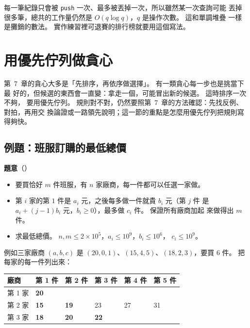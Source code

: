 每一筆紀錄只會被 \texttt{push} 一次、最多被丟掉一次，所以雖然某一次查詢可能
丟掉很多筆，總共的工作量仍然是 $O(q \log q)$，$q$ 是操作次數。 這和單調堆疊
一樣是攤銷的數法。 實作練習裡可退賽的排行榜就要用這個寫法。

\section{用優先佇列做貪心}
\label{sec:pq-greedy}

第~7~章的貪心大多是「先排序，再依序做選擇」。 有一類貪心每一步也是挑當下最
好的，但候選的東西會一直變：拿走一個，可能冒出新的候選。 這時排序一次不夠，
要用優先佇列。 規則對不對，仍然要照第~7~章的方法確認：先找反例、對拍，再用交
換論證或一路領先說明；這一節的重點是怎麼用優先佇列把規則寫得夠快。

\subsection{例題：班服訂購的最低總價}
\label{sec:ex-shirts}

\textbf{題意}（）

\begin{itemize}
\item 要買恰好 $m$ 件班服，有 $n$ 家廠商，每一件都可以任選一家做。
\item 第 $i$ 家的第 $1$ 件是 $a_i$ 元，之後每多做一件就貴 $b_i$ 元（第 $j$ 件
是 $a_i + (j - 1) b_i$ 元，$b_i \ge 0$），最多做 $c_i$ 件。 保證所有廠商加起
來做得出 $m$ 件。
\item 求最低總價。 $n, m \le 2 \times 10^5$，$a_i \le 10^9$，$b_i \le 10^6$，
$c_i \le 10^9$。
\end{itemize}

例如三家廠商 $(a, b, c)$ 是 $(20, 0, 1)$、$(15, 4, 5)$、$(18, 2, 3)$，要買
$6$ 件。 把每家的每一件列出來：

\begin{center}
\begin{tabular}{llllll}
\toprule
廠商 & 第 1 件 & 第 2 件 & 第 3 件 & 第 4 件 & 第 5 件 \\
\midrule
第 1 家 & \textbf{20} & & & & \\
第 2 家 & \textbf{15} & \textbf{19} & 23 & 27 & 31 \\
第 3 家 & \textbf{18} & \textbf{20} & \textbf{22} & & \\
\bottomrule
\end{tabular}
\end{center}

